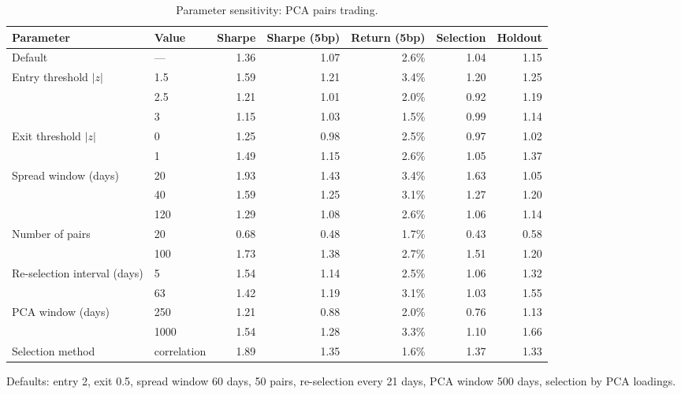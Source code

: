 \documentclass[11pt,letterpaper]{article}
\begin{document}
\begin{table}[!htbp]
    \centering
    \caption{Parameter sensitivity: PCA pairs trading.}
    \label{tab:sensitivity-pairs}
    \begin{tabular}{L{0.23}L{0.12}R{0.13}R{0.13}R{0.13}R{0.13}R{0.13}}
        \toprule
        Parameter & Value & Sharpe & Sharpe (5bp) & Return (5bp) & Selection & Holdout \\
        \midrule
        Default & --- & 1.36 & 1.07 & 2.6\% & 1.04 & 1.15 \\
        Entry threshold $|z|$ & 1.5 & 1.59 & 1.21 & 3.4\% & 1.20 & 1.25 \\
        & 2.5 & 1.21 & 1.01 & 2.0\% & 0.92 & 1.19 \\
        & 3 & 1.15 & 1.03 & 1.5\% & 0.99 & 1.14 \\
        Exit threshold $|z|$ & 0 & 1.25 & 0.98 & 2.5\% & 0.97 & 1.02 \\
        & 1 & 1.49 & 1.15 & 2.6\% & 1.05 & 1.37 \\
        Spread window (days) & 20 & 1.93 & 1.43 & 3.4\% & 1.63 & 1.05 \\
        & 40 & 1.59 & 1.25 & 3.1\% & 1.27 & 1.20 \\
        & 120 & 1.29 & 1.08 & 2.6\% & 1.06 & 1.14 \\
        Number of pairs & 20 & 0.68 & 0.48 & 1.7\% & 0.43 & 0.58 \\
        & 100 & 1.73 & 1.38 & 2.7\% & 1.51 & 1.20 \\
        Re-selection interval (days) & 5 & 1.54 & 1.14 & 2.5\% & 1.06 & 1.32 \\
        & 63 & 1.42 & 1.19 & 3.1\% & 1.03 & 1.55 \\
        PCA window (days) & 250 & 1.21 & 0.88 & 2.0\% & 0.76 & 1.13 \\
        & 1000 & 1.54 & 1.28 & 3.3\% & 1.10 & 1.66 \\
        Selection method & correlation & 1.89 & 1.35 & 1.6\% & 1.37 & 1.33 \\
        \bottomrule
    \end{tabular}
    \par\smallskip\noindent
    Defaults: entry 2, exit 0.5, spread window 60 days, 50 pairs, re-selection every 21 days,
    PCA window 500 days, selection by PCA loadings.
\end{table}
\end{document}
